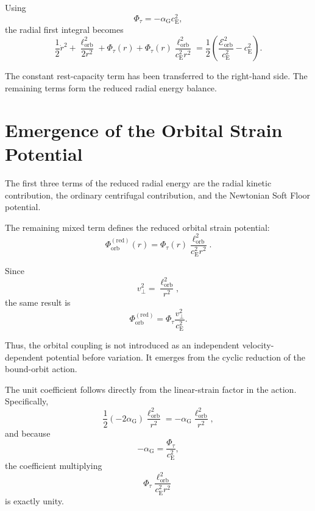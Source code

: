 Using
\begin{equation}
    \Phi_\tau = -\alpha_{\mathrm{G}}c_{\mathrm{E}}^2,
\end{equation}
the radial first integral becomes
\begin{equation}
    \frac{1}{2}\dot{r}^2 + \frac{\ell_{\mathrm{orb}}^2}{2r^2} + \Phi_\tau(r) + \Phi_\tau(r) \frac{\ell_{\mathrm{orb}}^2}{c_{\mathrm{E}}^2r^2} = \frac{1}{2} \left( \frac{\mathcal{E}_{\mathrm{orb}}^2}{c_{\mathrm{E}}^2} - c_{\mathrm{E}}^2 \right).
\end{equation}

The constant rest-capacity term has been transferred to the right-hand side. The remaining terms form the reduced radial energy balance.

\section{Emergence of the Orbital Strain Potential}

The first three terms of the reduced radial energy are the radial kinetic contribution, the ordinary centrifugal contribution, and the Newtonian Soft Floor potential.

The remaining mixed term defines the reduced orbital strain potential:
\begin{equation}
    \boxed{ \Phi_{\mathrm{orb}}^{(\mathrm{red})}(r) = \Phi_\tau(r) \frac{\ell_{\mathrm{orb}}^2}{c_{\mathrm{E}}^2r^2} }.
\end{equation}

Since
\begin{equation}
    v_\perp^2 = \frac{\ell_{\mathrm{orb}}^2}{r^2},
\end{equation}
the same result is
\begin{equation}
    \boxed{ \Phi_{\mathrm{orb}}^{(\mathrm{red})} = \Phi_\tau \frac{v_\perp^2}{c_{\mathrm{E}}^2} }.
\end{equation}

Thus, the orbital coupling is not introduced as an independent velocity-dependent potential before variation. It emerges from the cyclic reduction of the bound-orbit action.

The unit coefficient follows directly from the linear-strain factor in the action. Specifically,
\begin{equation}
    \frac{1}{2} \left( -2\alpha_{\mathrm{G}} \right) \frac{\ell_{\mathrm{orb}}^2}{r^2} = -\alpha_{\mathrm{G}} \frac{\ell_{\mathrm{orb}}^2}{r^2},
\end{equation}
and because
\begin{equation}
    -\alpha_{\mathrm{G}} = \frac{\Phi_\tau}{c_{\mathrm{E}}^2},
\end{equation}
the coefficient multiplying
\begin{equation}
    \Phi_\tau \frac{\ell_{\mathrm{orb}}^2}{c_{\mathrm{E}}^2r^2}
\end{equation}
is exactly unity.

